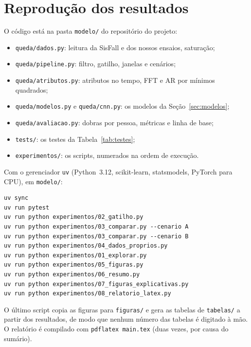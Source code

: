 \documentclass[12pt,a4paper]{article}
\newcommand{\code}[1]{\texttt{#1}}
\begin{document}
\appendix
\section{Reprodução dos resultados}\label{ap:reproducao}
O código está na pasta \code{modelo/} do repositório do projeto:
\begin{itemize}[leftmargin=1.5em]
\item \code{queda/dados.py}: leitura da SisFall e dos nossos ensaios, saturação;
\item \code{queda/pipeline.py}: filtro, gatilho, janelas e cenários;
\item \code{queda/atributos.py}: atributos no tempo, FFT e AR por mínimos quadrados;
\item \code{queda/modelos.py} e \code{queda/cnn.py}: os modelos da
  Seção~\ref{sec:modelos};
\item \code{queda/avaliacao.py}: dobras por pessoa, métricas e linha de base;
\item \code{tests/}: os testes da Tabela~\ref{tab:testes};
\item \code{experimentos/}: os scripts, numerados na ordem de execução.
\end{itemize}
Com o gerenciador \code{uv} (Python~3.12, scikit-learn, statsmodels, PyTorch para CPU),
em \code{modelo/}:
\begin{verbatim}
uv sync
uv run pytest
uv run python experimentos/02_gatilho.py
uv run python experimentos/03_comparar.py --cenario A
uv run python experimentos/03_comparar.py --cenario B
uv run python experimentos/04_dados_proprios.py
uv run python experimentos/01_explorar.py
uv run python experimentos/05_figuras.py
uv run python experimentos/06_resumo.py
uv run python experimentos/07_figuras_explicativas.py
uv run python experimentos/08_relatorio_latex.py
\end{verbatim}
O último script copia as figuras para \code{figuras/} e gera as tabelas de
\code{tabelas/} a partir dos resultados, de modo que nenhum número das tabelas é
digitado à mão. O relatório é compilado com \code{pdflatex main.tex} (duas vezes, por
causa do sumário).
\end{document}
